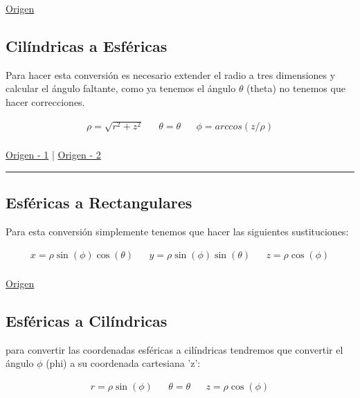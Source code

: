 \documentclass{article}
\begin{document}
\href{https://www.neurochispas.com/wiki/coordenadas-cilindricas-a-cartesianas/}{Origen}

\subsection{Cilíndricas a Esféricas}
\label{sec:org9f8896c}
Para hacer esta conversión es necesario extender el radio a tres dimensiones y calcular el ángulo faltante, como ya tenemos el ángulo \(\theta\) (theta) no tenemos que hacer correcciones.

\[\begin{aligned}
 \rho = \sqrt{r^2+z^2} && 
 \theta = \theta  &&
 \phi = arccos\left( z/\rho \right) \\
\end{aligned}\] 

\href{http://www.learningaboutelectronics.com/Articulos/Calculadora-de-conversion-de-coordenadas-cilindricas-a-esfericas.php}{Origen - 1} | \href{https://math.libretexts.org/Bookshelves/Calculus/Book:\_Calculus\_(OpenStax)/12:\_Vectors\_in\_Space/12.7:\_Cylindrical\_and\_Spherical\_Coordinates\#:\~:text=To\%20convert\%20a\%20point\%20from,r2+z2).}{Origen - 2}

\noindent\rule{\textwidth}{0.5pt}

\subsection{Esféricas a Rectangulares}
\label{sec:orgf823c6c}
Para esta conversión simplemente tenemos que hacer las siguientes sustituciones:

\[\begin{aligned}
 x = \rho \sin(\phi)\cos(\theta) && 
 y = \rho \sin(\phi)\sin(\theta) &&
 z = \rho \cos(\phi) \\
\end{aligned}\] 

\href{https://www.neurochispas.com/wiki/coordenadas-esfericas-a-cartesianas/}{Origen}

\subsection{Esféricas a Cilíndricas}
\label{sec:orgb4dd4b7}
para convertir las coordenadas esféricas a cilíndricas tendremos que convertir el ángulo \(\phi\) (phi) a su coordenada cartesiana 'z':

\[\begin{aligned}
 r = \rho \sin(\phi) && 
 \theta = \theta &&
 z = \rho \cos(\phi) \\
\end{aligned}\] 
\end{document}
